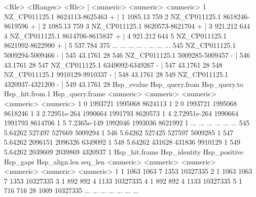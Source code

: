 \documentclass[letterpaper]{article}
\begin{document}
\begin{Schunk}
\begin{Soutput}
              <Rle>       <IRanges>  <Rle> | <numeric>     <numeric> <numeric>
    1 NZ_CP011125.1 8624113-8625463      + |         1       1085.13       759
    2 NZ_CP011125.1 8618246-8619596      + |         2       1085.13       759
    3 NZ_CP011125.1 8620573-8621704      + |         3       921.212       644
    4 NZ_CP011125.1 8614706-8615837      + |         4       921.212       644
    5 NZ_CP011125.1 8621992-8622990      + |         5       537.784       375
  ...           ...             ...    ... .       ...           ...       ...
  545 NZ_CP011125.1 5009294-5009466      - |       545       43.1761        28
  546 NZ_CP011125.1 5009285-5009457      - |       546       43.1761        28
  547 NZ_CP011125.1 6349092-6349267      - |       547       43.1761        28
  548 NZ_CP011125.1 9910129-9910337      - |       548       43.1761        28
  549 NZ_CP011125.1 4320937-4321200      - |       549       43.1761        28
        Hsp_evalue Hsp_query.from Hsp_query.to Hsp_hit.from.1 Hsp_query.frame
         <numeric>      <numeric>    <numeric>      <numeric>       <numeric>
    1            0        1993721      1995068        8624113               1
    2            0        1993721      1995068        8618246               1
    3 2.72951e-264        1990664      1991793        8620573               1
    4 2.72951e-264        1990664      1991793        8614706               1
    5  7.2365e-149        1992046      1993036        8621992               1
  ...          ...            ...          ...            ...             ...
  545      5.64262         527497       527669        5009294               1
  546      5.64262         527425       527597        5009285               1
  547      5.64262        2096151      2096326        6349092               1
  548      5.64262         431628       431836        9910129               1
  549      5.64262        2039609      2039869        4320937               1
      Hsp_hit.frame Hsp_identity Hsp_positive  Hsp_gaps Hsp_align.len   seq_len
          <numeric>    <numeric>    <numeric> <numeric>     <numeric> <numeric>
    1             1         1063         1063         7          1353  10327335
    2             1         1063         1063         7          1353  10327335
    3             1          892          892         4          1133  10327335
    4             1          892          892         4          1133  10327335
    5             1          716          716        28          1009  10327335
  ...           ...          ...          ...       ...           ...       ...

\end{Soutput}
\end{Schunk}
\end{document}
